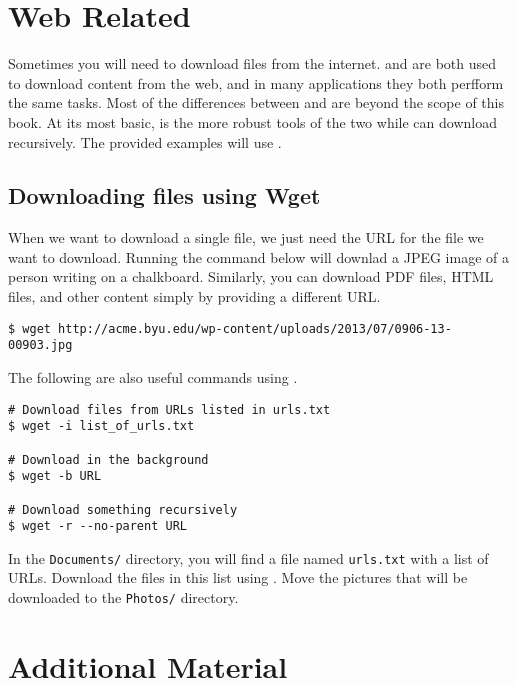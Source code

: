 \section*{Web Related}
Sometimes you will need to download files from the internet.
 and  are both used to download content from the web, and in many applications they both perfform the same tasks.
Most of the differences between  and  are beyond the scope of this book.
At its most basic,  is the more robust tools of the two while  can download recursively.
The provided examples will use .

\subsection*{Downloading files using Wget}

When we want to download a single file, we just need the URL for the file we want to download.
Running the command below will downlad a JPEG image of a person writing on a chalkboard.
Similarly, you can download PDF files, HTML files, and other content simply by providing a different URL.

\begin{lstlisting}
$ wget http://acme.byu.edu/wp-content/uploads/2013/07/0906-13-00903.jpg
\end{lstlisting}

The following are also useful commands using .

\begin{lstlisting}
# Download files from URLs listed in urls.txt
$ wget -i list_of_urls.txt

# Download in the background
$ wget -b URL

# Download something recursively
$ wget -r --no-parent URL
\end{lstlisting}

\begin{problem}
In the \texttt{Documents/} directory, you will find a file named \texttt{urls.txt} with a list of URLs.
Download the files in this list using .
Move the pictures that will be downloaded to the \texttt{Photos/} directory.
\end{problem}

\newpage

\section*{Additional Material}

